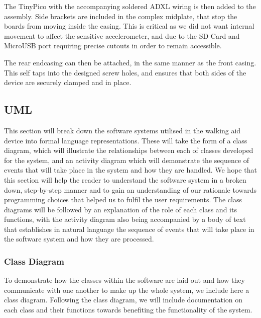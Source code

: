             The TinyPico with the accompanying soldered ADXL wiring is then added to the assembly. Side brackets are included in the complex midplate, that stop the boards from moving inside the casing. This is critical as we did not want internal movement to affect the sensitive accelerometer, and due to the SD Card and MicroUSB port requiring precise cutouts in order to remain accessible.

            

            The rear endcasing can then be attached, in the same manner as the front casing. This self taps into the designed screw holes, and ensures that both sides of the device are securely clamped and in place.


        \subsection{UML}
        \label{sec:uml_walk_aid}
        
            This section will break down the software systems utilised in the walking aid device into formal language representations. These will take the form of a class diagram, which will illustrate the relationships between each of classes developed for the system, and an activity diagram which will demonstrate the sequence of events that will take place in the system and how they are handled. We hope that this section will help the reader to understand the software system in a broken down, step-by-step manner and to gain an understanding of our rationale towards programming choices that helped us to fulfil the user requirements. The class diagrams will be followed by an explanation of the role of each class and its functions, with the activity diagram also being accompanied by a body of text that establishes in natural language the sequence of events that will take place in the software system and how they are processed.

            \subsubsection{Class Diagram}
            \label{subsubsec:class_diagram_walking_aid}

                To demonstrate how the classes within the software are laid out and how they communicate with one another to make up the whole system, we include here a class diagram. Following the class diagram, we will include documentation on each class and their functions towards benefiting the functionality of the system. 

